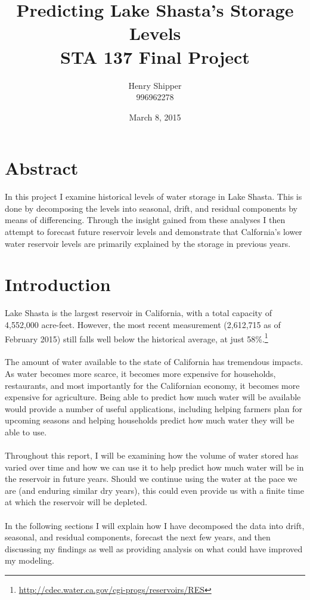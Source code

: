 \documentclass[twoside,12pt]{article}
\title{Predicting Lake Shasta's Storage Levels \\ STA 137 Final Project}
\author{Henry Shipper \\ 996962278}
\date{March 8, 2015}
\begin{document}
\maketitle
\pagebreak
\part{Abstract}
In this project I examine historical levels of water storage in Lake Shasta. This is done by decomposing the levels into seasonal, drift, and residual components by means of differencing. Through the insight gained from these analyses I then attempt to forecast future reservoir levels and demonstrate that Calfornia's lower water reservoir levels are primarily explained by the storage in previous years.

\part{Introduction}
 Lake Shasta is the largest reservoir in California, with a total capacity of 4,552,000 acre-feet. However, the most recent measurement (2,612,715 as of February 2015) still falls well below the historical average, at just 58\%.\footnote{\url{http://cdec.water.ca.gov/cgi-progs/reservoirs/RES}} \\ \\
The amount of water available to the state of California has tremendous impacts. As water becomes more scarce, it becomes more expensive for households, restaurants, and most importantly for the Californian economy, it becomes more expensive for agriculture. Being able to predict how much water will be available would provide a number of useful applications, including helping farmers plan for upcoming seasons and helping households predict how much water they will be able to use.\\ \\
Throughout this report, I will be examining how the volume of water stored has varied over time and how we can use it to help predict how much water will be in the reservoir in future years. Should we continue using the water at the pace we are (and enduring similar dry years), this could even provide us with a finite time at which the reservoir will be depleted.\\ \\
In the following sections I will explain how I have decomposed the data into drift, seasonal, and residual components, forecast the next few years, and then discussing my findings as well as providing analysis on what could have improved my modeling.\\ 
\end{document}
